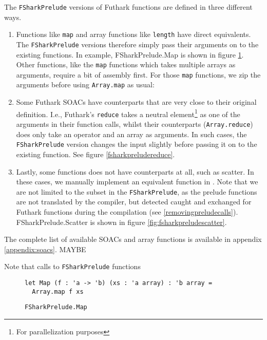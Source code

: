 The \texttt{FSharkPrelude} versions of Futhark functions are defined in three
different ways.
\begin{enumerate}
  \item Functions like \texttt{map} and array functions like
    \texttt{length} have direct \fsharp{} equivalents. The
    \texttt{FSharkPrelude} versions therefore simply pass their arguments on to
    the existing functions. In example, FSharkPrelude.Map is shown in figure
    \ref{fig:fsharkpreludemap}.
    Other functions, like the \texttt{map} functions which takes multiple arrays as
    arguments, require a bit of assembly first. For those \texttt{map} functions,
    we zip the arguments before using \texttt{Array.map} as usual:

  \item Some Futhark SOACs have \fsharp{} counterparts that are very close to
    their original definition.
    I.e., Futhark's \texttt{reduce} takes a neutral element\footnote{For
      parallelization purposes} as one of the
    arguments in their function calls, whilst their \fsharp{} counterparts
    (\texttt{Array.reduce}) does only take an operator and an array as
    arguments.
    In such cases, the \texttt{FSharkPrelude} version changes the input slightly
    before passing it on to the existing function. See figure
    \ref{fsharkpreludereduce}.

  \item Lastly, some functions does not have \fsharp{} counterparts at all, such
    as scatter. In these cases, we manually implement an equivalent function in
    \fsharp{}.
    Note that we are not limited to the \fshark{} subset in the
    \texttt{FSharkPrelude}, as the prelude functions are not translated by the
    \fshark{} compiler, but detected caught and exchanged for
    Futhark functions during the \fshark{} compilation (see \ref{removingpreludecalls}).
    FSharkPrelude.Scatter is shown in figure \ref{fig:fsharkpreludescatter}.

\end{enumerate}
The complete list of available SOACs and array functions is available in
appendix \ref{appendix:soacs}. MAYBE

Note that calls to \texttt{FSharkPrelude} functions 

\clearpage
\begin{figure}[H]
\centering
\begin{verbatim}
let Map (f : 'a -> 'b) (xs : 'a array) : 'b array =
  Array.map f xs
\end{verbatim}
\caption{\texttt{FSharkPrelude.Map}}
\label{fig:fsharkpreludemap}
\end{figure}

